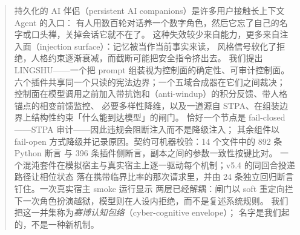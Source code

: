 \begin{abstract}
持久化的 AI 伴侣（persistent AI companions）是许多用户接触长上下文 Agent 的入口：
有人用数百轮对话养一个数字角色，然后它忘了自己的名字或口头禅，关掉会话它就不在了。
这种失效较少来自能力，更多来自注入面（injection surface）：记忆被当作当前事实来读，
风格信号软化了拒绝，人格约束逐渐衰减，而截断可能把安全指令挤出去。
我们提出 LINGSHU——一个把 prompt 组装视为控制面的确定性、可审计控制面。
六个插件共享同一个只读的宪法边界；一个五域合成器在它们之间裁决；
控制面在模型调用之前加入带抗饱和（anti-windup）的积分反馈、带人格锚点的相变前馈监控、
必要多样性降维，以及一道源自 STPA、在组装边界上结构性约束「什么能到达模型」的闸门。
恰好一个节点是 fail-closed——STPA 审计——因此违规会阻断注入而不是降级注入；
其余组件以 fail-open 方式降级并记录原因。契约可机器校验：14 个文件中的 892 条 Python 断言
与 396 条插件侧断言，副本之间的参数一致性按键比对。
一个混沌套件在模拟宿主与真实宿主上逐一驱动每个机制；v5.4 的同回合投递路径让相位状态
落在携带临界比率的那次请求里，并由 24 条独立回归断言钉住。一次真实宿主 smoke 运行显示
两层已经解耦：闸门以 soft 重定向拦下一次角色扮演越狱，模型则在人设内拒绝，而不是复述系统规则。
我们把这一并集称为\emph{赛博认知包络}（cyber-cognitive envelope）；
名字是我们起的，不是一种新机制。
\end{abstract}

